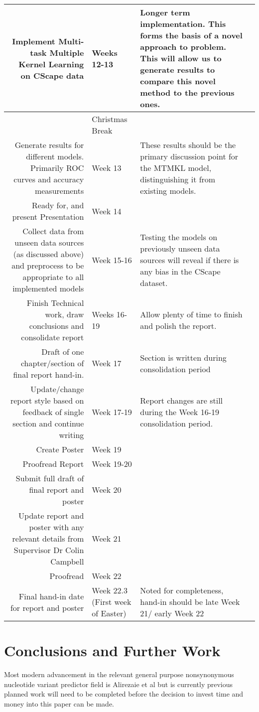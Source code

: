 \documentclass[11pt]{article}
\begin{document}
\begin{longtable}{|Rp{\tabcolsep\relax}|p{\tabcolsep\relax}|p{\tabcolsep\relax}|}
	Implement Multi-task Multiple Kernel Learning on CScape data & Weeks 12-13 & Longer term implementation. This forms the basis of a novel approach to problem. This will allow us to generate results to compare this novel method to the previous ones. \\ \hline
	& Christmas Break & \\ \hline
	Generate results for different models. Primarily ROC curves and accuracy measurements & Week 13 & These results should be the primary discussion point for the MTMKL model, distinguishing it from existing models.\\ \hline
 	Ready for, and present Presentation & Week 14 & \\ \hline
	Collect data from unseen data sources (as discussed above) and preprocess to be appropriate to all implemented models & Week 15-16 & Testing the models on previously unseen data sources will reveal if there is any bias in the CScape dataset.\\ \hline
	Finish Technical work, draw conclusions and consolidate report & Weeks 16-19 & Allow plenty of time to finish and polish the report. \\ \hline
	Draft of one chapter/section of final report hand-in. &  Week 17 & Section is written during consolidation period \\ \hline
	Update/change report style based on feedback of single section and continue writing & Week 17-19 & Report changes are still during the Week 16-19 consolidation period. \\ \hline
	Create Poster & Week 19 & \\ \hline
	Proofread Report & Week 19-20 & \\ \hline
	Submit full draft of final report and poster & Week 20 & \\ \hline
	Update report and poster with any relevant details from Supervisor Dr Colin Campbell & Week 21 & \\ \hline
	Proofread & Week 22 & \\
	Final hand-in date for report and poster & Week 22.3 (First week of Easter) & Noted for completeness, hand-in should be late Week 21/ early Week 22 \\ \hline
\end{longtable}

\section{Conclusions and Further Work}

Most modern advancement in the relevant general purpose nonsynonymous nucleotide variant predictor field is Alirezaie et al\cite{Alirezaie2018} but is currently previous planned work will need to be completed before the decision to invest time and money into this paper can be made.

%

\printbibliography
\end{document}

